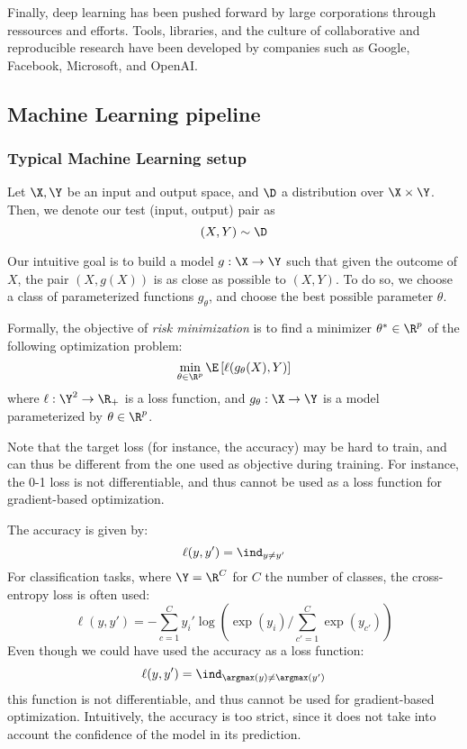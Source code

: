 Finally, deep learning has been pushed forward by large corporations through ressources and efforts. Tools, libraries, and the culture of collaborative and reproducible research have been developed by companies such as Google, Facebook, Microsoft, and OpenAI.

\subsection{Machine Learning pipeline}
\subsubsection{Typical Machine Learning setup}
Let $\X, \Y$ be an input and output space, and $\D$ a distribution over $\X\times\Y$. Then, we denote our test (input, output) pair as
\begin{equation*}
    (X, Y) \sim \D
\end{equation*}

Our intuitive goal is to build a model $g:\X\to\Y$ such that given the outcome of $X$, the pair $(X, g(X))$ is as close as possible to $(X, Y)$. To do so, we choose a class of parameterized functions $g_\theta$, and choose the best possible parameter $\theta$.

Formally, the objective of \emph{risk minimization} is to find a minimizer $\theta^*\in\R^p$ of the following optimization problem:
\begin{equation*}
    \min_{\theta\in\R^p} \E\left[\ell(g_\theta(X), Y)\right]
\end{equation*}
where $\ell:\Y^2\to\R_+$ is a loss function, and $g_\theta:\X\to\Y$ is a model parameterized by $\theta\in\R^p$.

Note that the target loss (for instance, the accuracy) may be hard to train, and can thus be different from the one used as objective during training. For instance, the 0-1 loss is not differentiable, and thus cannot be used as a loss function for gradient-based optimization.

The accuracy is given by:
\begin{equation*}
    \ell(y, y') = \ind_{y\neq y'}
\end{equation*}
For classification tasks, where $\Y=\R^C$ for $C$ the number of classes, the cross-entropy loss is often used:
\begin{equation*}
    \ell(y, y') = -\sum_{c=1}^C y_i' \log\left(\exp(y_i) / \sum_{c'=1}^C \exp(y_{c'})\right)
\end{equation*}
Even though we could have used the accuracy as a loss function:
\begin{equation*}
    \ell(y, y') = \ind_{\argmax(y) \neq \argmax(y')}
\end{equation*}
this function is not differentiable, and thus cannot be used for gradient-based optimization. Intuitively, the accuracy is too strict, since it does not take into account the confidence of the model in its prediction.

